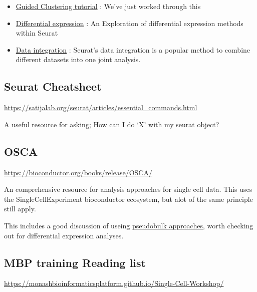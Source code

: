 \documentclass[
]{book}
\providecommand{\tightlist}{%
  \setlength{\itemsep}{0pt}\setlength{\parskip}{0pt}}
\begin{document}
\begin{itemize}
\tightlist
\item
  \href{https://satijalab.org/seurat/articles/pbmc3k_tutorial.html}{Guided Clustering tutorial} : We've just worked through this
\item
  \href{https://satijalab.org/seurat/archive/v3.1/de_vignette.html}{Differential expression} : An Exploration of differential expression methods within Seurat
\item
  \href{https://satijalab.org/seurat/articles/integration_introduction.html}{Data integration} : Seurat's data integration is a popular method to combine different datasets into one joint analysis.
\end{itemize}

\subsection*{Seurat Cheatsheet}\label{seurat-cheatsheet}

\url{https://satijalab.org/seurat/articles/essential_commands.html}

A useful resource for asking; How can I do `X' with my seurat object?

\subsection*{OSCA}\label{osca}

\url{https://bioconductor.org/books/release/OSCA/}

An comprehensive resource for analysis approaches for single cell data.
This uses the SingleCellExperiment bioconductor ecosystem, but alot of the same principle still apply.

This includes a good discussion of useing \href{http://bioconductor.org/books/3.15/OSCA.multisample/multi-sample-comparisons.html\#creating-pseudo-bulk-samples}{pseudobulk approaches}, worth checking out for differential expression analyses.

\subsection*{MBP training Reading list}\label{mbp-training-reading-list}

\url{https://monashbioinformaticsplatform.github.io/Single-Cell-Workshop/}
\end{document}
